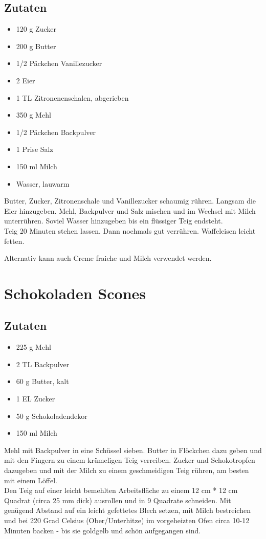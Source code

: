 \documentclass{article}
\begin{document}
\subsection*{Zutaten} %
\label{sub:zutaten}
	\begin{itemize}
		\item 120 g Zucker
		\item 200 g Butter
		\item 1/2 Päckchen Vanillezucker
		\item 2 Eier
		\item 1 TL Zitronenenschalen, abgerieben
		\item 350 g Mehl
		\item 1/2 Päckchen Backpulver
		\item 1 Prise Salz
		\item 150 ml Milch
		\item Wasser, lauwarm
	\end{itemize}
	Butter, Zucker, Zitronenschale und Vanillezucker schaumig rühren.
	Langsam die Eier hinzugeben. Mehl, Backpulver und Salz mischen und im Wechsel mit Milch
	unterrühren. Soviel Wasser hinzugeben bis ein flüssiger Teig endsteht.\\
	Teig 20 Minuten stehen lassen. Dann nochmals gut verrühren. Waffeleisen leicht fetten.

	Alternativ kann auch Creme fraiche und Milch verwendet werden.

\newpage
\section{Schokoladen Scones} %
\label{sec:schokoladen_scones}
\subsection*{Zutaten} %
\label{sub:zutaten}
	\begin{itemize}
		\item 225 g Mehl
		\item 2 TL Backpulver
		\item 60 g Butter, kalt
		\item 1 EL Zucker
		\item 50 g Schokoladendekor
		\item 150 ml Milch
	\end{itemize}

	Mehl mit Backpulver in eine Schüssel sieben.
	Butter in Flöckchen dazu geben und mit den Fingern zu einem krümeligen Teig verreiben.
	Zucker und Schokotropfen dazugeben und mit der Milch zu einem geschmeidigen Teig rühren,
	am besten mit einem Löffel.\\
	Den Teig auf einer leicht bemehlten Arbeitsfläche
	zu einem 12 cm * 12 cm Quadrat (circa 25 mm dick) ausrollen
	und in 9 Quadrate schneiden.
	Mit genügend Abstand auf ein leicht gefettetes Blech setzen,
	mit Milch bestreichen
	und bei 220 Grad Celsius (Ober/Unterhitze) im vorgeheizten Ofen circa 10-12 Minuten backen
	- bis sie goldgelb und schön aufgegangen sind.
\end{document}

